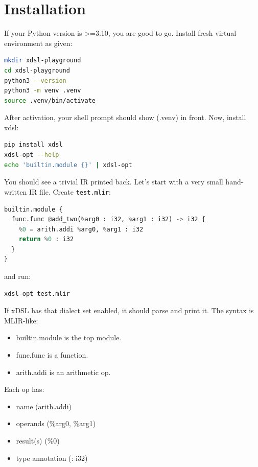 \documentclass[../main.tex]{subfiles}
\begin{document}
\section{Installation}
If your Python version is >=3.10, you are good to go. Install fresh virtual environment as given:
\begin{lstlisting}[language=bash, caption={Setting up environment}]
mkdir xdsl-playground
cd xdsl-playground
python3 --version
python3 -m venv .venv
source .venv/bin/activate
\end{lstlisting}
After activation, your shell prompt should show (.venv) in front. Now, install xdsl:
\begin{lstlisting}[language=bash, caption={xDSL installation}]
pip install xdsl
xdsl-opt --help
echo 'builtin.module {}' | xdsl-opt
\end{lstlisting}
You should see a trivial IR printed back.
Let’s start with a very small hand-written IR file. Create \texttt{test.mlir}:
\begin{lstlisting}[language=Python, caption={xDSL example}]
builtin.module {
  func.func @add_two(%arg0 : i32, %arg1 : i32) -> i32 {
    %0 = arith.addi %arg0, %arg1 : i32
    return %0 : i32
  }
}
\end{lstlisting}
and run:
\begin{lstlisting}[language=bash, caption={}]
xdsl-opt test.mlir
\end{lstlisting}
If xDSL has that dialect set enabled, it should parse and print it.
The syntax is MLIR-like:
\begin{itemize}
    \item builtin.module is the top module.
    \item func.func is a function.
    \item arith.addi is an arithmetic op.
\end{itemize}
Each op has:
\begin{itemize}
    \item name (arith.addi)
    \item operands (\%arg0, \%arg1)
    \item result(s) (\%0)
    \item type annotation (: i32)
\end{itemize}
\end{document}

